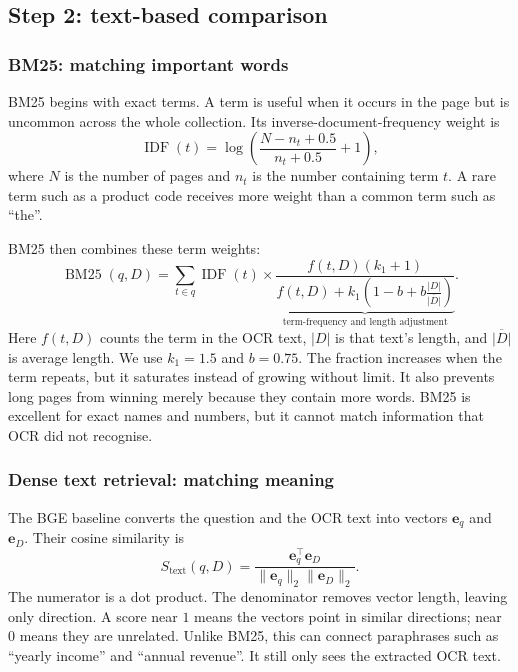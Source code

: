 \documentclass[11pt,a4paper]{article}
\begin{document}
\subsection{Step 2: text-based comparison}

\subsubsection*{BM25: matching important words}

BM25 begins with exact terms. A term is useful when it occurs in the page but is uncommon across the whole collection. Its inverse-document-frequency weight is
\begin{equation}
\operatorname{IDF}(t)=\log\left(\frac{N-n_t+0.5}{n_t+0.5}+1\right),
\end{equation}
where $N$ is the number of pages and $n_t$ is the number containing term $t$. A rare term such as a product code receives more weight than a common term such as ``the''.

BM25 then combines these term weights:
\begin{equation}
\operatorname{BM25}(q,D)=\sum_{t\in q}\operatorname{IDF}(t)\times
\underbrace{\frac{f(t,D)(k_1+1)}{f(t,D)+k_1\left(1-b+b\frac{|D|}{\overline{|D|}}\right)}}_{\text{term-frequency and length adjustment}}.
\label{eq:bm25}
\end{equation}
Here $f(t,D)$ counts the term in the OCR text, $|D|$ is that text's length, and $\overline{|D|}$ is average length. We use $k_1=1.5$ and $b=0.75$. The fraction increases when the term repeats, but it saturates instead of growing without limit. It also prevents long pages from winning merely because they contain more words. BM25 is excellent for exact names and numbers, but it cannot match information that OCR did not recognise.

\subsubsection*{Dense text retrieval: matching meaning}

The BGE baseline converts the question and the OCR text into vectors $\bm e_q$ and $\bm e_D$. Their cosine similarity is
\begin{equation}
S_{\mathrm{text}}(q,D)=\frac{\bm e_q^\top \bm e_D}{\|\bm e_q\|_2\|\bm e_D\|_2}.
\label{eq:cosine}
\end{equation}
The numerator is a dot product. The denominator removes vector length, leaving only direction. A score near $1$ means the vectors point in similar directions; near $0$ means they are unrelated. Unlike BM25, this can connect paraphrases such as ``yearly income'' and ``annual revenue''. It still only sees the extracted OCR text.
\end{document}
